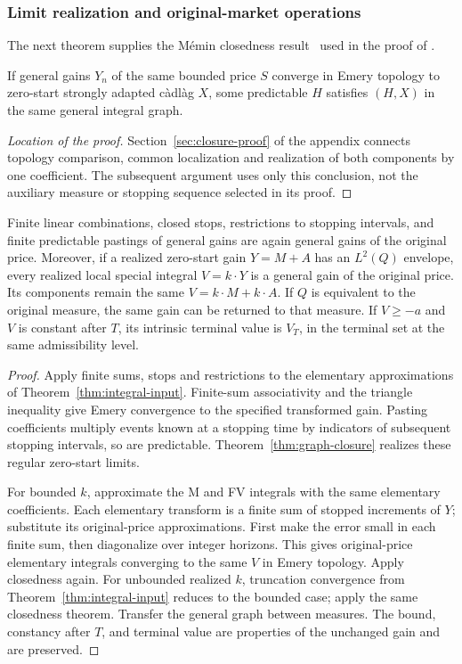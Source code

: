 \subsubsection{Limit realization and original-market operations}
The next theorem supplies the M\'emin closedness result~\cite{Memin80} used in the proof of
\cite[Theorem 4.2]{DS}.
\begin{theorem}\label{thm:graph-closure}
If general gains $Y_n$ of the same bounded price $S$ converge in Emery
topology to zero-start strongly adapted c\`adl\`ag $X$, some predictable $H$
satisfies $(H,X)$ in the same general integral graph.
\end{theorem}
\begin{proof}[Location of the proof]
Section~\ref{sec:closure-proof} of the appendix connects topology comparison,
common localization and realization of both components by one coefficient.
The subsequent argument uses only this conclusion, not the auxiliary
measure or stopping sequence selected in its proof.
\end{proof}

\begin{corollary}\label{cor:market-operations}
Finite linear combinations, closed stops, restrictions to stopping intervals,
and finite predictable pastings of general gains are again general gains
of the original price. Moreover, if a realized zero-start gain $Y=M+A$
has an $L^2(Q)$ envelope, every realized local special integral $V=k\cdot Y$
is a general gain of the original price. Its components remain the same
$V=k\cdot M+k\cdot A$. If $Q$ is equivalent to the original measure, the
same gain can be returned to that measure. If $V\geq-a$ and $V$ is constant
after $T$, its intrinsic terminal value is $V_T$, in the terminal set at
the same admissibility level.
\end{corollary}
\begin{proof}
Apply finite sums, stops and restrictions to the elementary approximations
of Theorem~\ref{thm:integral-input}. Finite-sum associativity and the triangle
inequality give Emery convergence to the specified transformed gain.
Pasting coefficients multiply events known at a stopping time by indicators
of subsequent stopping intervals, so are predictable.
Theorem~\ref{thm:graph-closure} realizes these regular zero-start limits.

For bounded $k$, approximate the M and FV integrals with the same elementary
coefficients. Each elementary transform is a finite sum of stopped increments
of $Y$; substitute its original-price approximations. First make the error
small in each finite sum, then diagonalize over integer horizons. This gives
original-price elementary integrals converging to the same $V$ in Emery
topology. Apply closedness again. For unbounded realized $k$, truncation
convergence from Theorem~\ref{thm:integral-input} reduces to the bounded case;
apply the same closedness theorem. Transfer the general graph between measures.
The bound, constancy after $T$, and terminal value are properties of the
unchanged gain and are preserved.
\end{proof}
